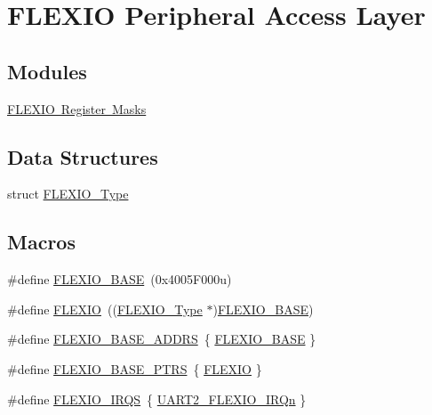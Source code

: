 \hypertarget{group___f_l_e_x_i_o___peripheral___access___layer}{}\section{F\+L\+E\+X\+IO Peripheral Access Layer}
\label{group___f_l_e_x_i_o___peripheral___access___layer}
\subsection*{Modules}
\begin{DoxyCompactItemize}
\item 
\mbox{\hyperlink{group___f_l_e_x_i_o___register___masks}{F\+L\+E\+X\+I\+O Register Masks}}
\end{DoxyCompactItemize}
\subsection*{Data Structures}
\begin{DoxyCompactItemize}
\item 
struct \mbox{\hyperlink{struct_f_l_e_x_i_o___type}{F\+L\+E\+X\+I\+O\+\_\+\+Type}}
\end{DoxyCompactItemize}
\subsection*{Macros}
\begin{DoxyCompactItemize}
\item 
\#define \mbox{\hyperlink{group___f_l_e_x_i_o___peripheral___access___layer_ga657c5c2bede2b43ecfb4bf396fa0ddcc}{F\+L\+E\+X\+I\+O\+\_\+\+B\+A\+SE}}~(0x4005\+F000u)
\item 
\#define \mbox{\hyperlink{group___f_l_e_x_i_o___peripheral___access___layer_ga42b29f5cbbe7ec3b88557b2da6b47c44}{F\+L\+E\+X\+IO}}~((\mbox{\hyperlink{struct_f_l_e_x_i_o___type}{F\+L\+E\+X\+I\+O\+\_\+\+Type}} $\ast$)\mbox{\hyperlink{group___f_l_e_x_i_o___peripheral___access___layer_ga657c5c2bede2b43ecfb4bf396fa0ddcc}{F\+L\+E\+X\+I\+O\+\_\+\+B\+A\+SE}})
\item 
\#define \mbox{\hyperlink{group___f_l_e_x_i_o___peripheral___access___layer_ga094d4c6da7bfc87ccf5ce63b4fa7e9ab}{F\+L\+E\+X\+I\+O\+\_\+\+B\+A\+S\+E\+\_\+\+A\+D\+D\+RS}}~\{ \mbox{\hyperlink{group___f_l_e_x_i_o___peripheral___access___layer_ga657c5c2bede2b43ecfb4bf396fa0ddcc}{F\+L\+E\+X\+I\+O\+\_\+\+B\+A\+SE}} \}
\item 
\#define \mbox{\hyperlink{group___f_l_e_x_i_o___peripheral___access___layer_ga8dc3fff3fb50fd2fd9d2e879ead9c59d}{F\+L\+E\+X\+I\+O\+\_\+\+B\+A\+S\+E\+\_\+\+P\+T\+RS}}~\{ \mbox{\hyperlink{group___f_l_e_x_i_o___peripheral___access___layer_ga42b29f5cbbe7ec3b88557b2da6b47c44}{F\+L\+E\+X\+IO}} \}
\item 
\#define \mbox{\hyperlink{group___f_l_e_x_i_o___peripheral___access___layer_gad1413d220005bcc97717e98dd6dbb518}{F\+L\+E\+X\+I\+O\+\_\+\+I\+R\+QS}}~\{ \mbox{\hyperlink{group___interrupt__vector__numbers_gga666eb0caeb12ec0e281415592ae89083a5475321bd2bac9aae86ed45895c66b1f}{U\+A\+R\+T2\+\_\+\+F\+L\+E\+X\+I\+O\+\_\+\+I\+R\+Qn}} \}
\end{DoxyCompactItemize}


